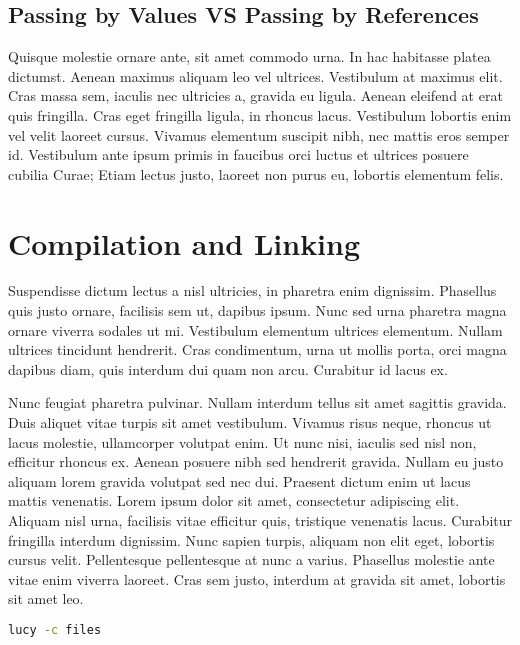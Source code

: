 \subsection{Passing by Values VS Passing by References}
Quisque molestie ornare ante, sit amet commodo urna. In hac habitasse platea dictumst. Aenean maximus aliquam leo vel ultrices. Vestibulum at maximus elit. Cras massa sem, iaculis nec ultricies a, gravida eu ligula. Aenean eleifend at erat quis fringilla. Cras eget fringilla ligula, in rhoncus lacus. Vestibulum lobortis enim vel velit laoreet cursus. Vivamus elementum suscipit nibh, nec mattis eros semper id. Vestibulum ante ipsum primis in faucibus orci luctus et ultrices posuere cubilia Curae; Etiam lectus justo, laoreet non purus eu, lobortis elementum felis.


\section{Compilation and Linking}
Suspendisse dictum lectus a nisl ultricies, in pharetra enim dignissim. Phasellus quis justo ornare, facilisis sem ut, dapibus ipsum. Nunc sed urna pharetra magna ornare viverra sodales ut mi. Vestibulum elementum ultrices elementum. Nullam ultrices tincidunt hendrerit. Cras condimentum, urna ut mollis porta, orci magna dapibus diam, quis interdum dui quam non arcu. Curabitur id lacus ex.

Nunc feugiat pharetra pulvinar. Nullam interdum tellus sit amet sagittis gravida. Duis aliquet vitae turpis sit amet vestibulum. Vivamus risus neque, rhoncus ut lacus molestie, ullamcorper volutpat enim. Ut nunc nisi, iaculis sed nisl non, efficitur rhoncus ex. Aenean posuere nibh sed hendrerit gravida. Nullam eu justo aliquam lorem gravida volutpat sed nec dui. Praesent dictum enim ut lacus mattis venenatis. Lorem ipsum dolor sit amet, consectetur adipiscing elit. Aliquam nisl urna, facilisis vitae efficitur quis, tristique venenatis lacus. Curabitur fringilla interdum dignissim. Nunc sapien turpis, aliquam non elit eget, lobortis cursus velit. Pellentesque pellentesque at nunc a varius. Phasellus molestie ante vitae enim viverra laoreet. Cras sem justo, interdum at gravida sit amet, lobortis sit amet leo.
\begin{lstlisting}[language=Bash]
  lucy -c files
\end{lstlisting}
